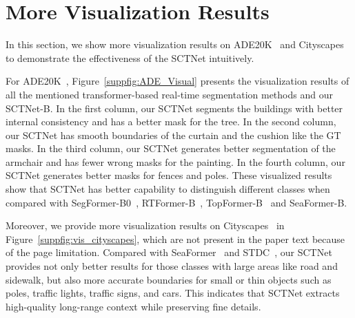 \documentclass[letterpaper]{article} %
\begin{document}
\section{More Visualization Results}\label{section:E}
In this section, we show more visualization results on ADE20K~\cite{zhou2017scene} and Cityscapes~\cite{cordts2016cityscapes} to demonstrate the effectiveness of the SCTNet intuitively.

For ADE20K~\cite{zhou2017scene}, Figure~\ref{suppfig:ADE_Visual} presents the visualization results of all the mentioned transformer-based real-time segmentation methods and our SCTNet-B. In the first column, our SCTNet segments the buildings with better internal consistency and has a better mask for the tree. In the second column, our SCTNet has smooth boundaries of the curtain and the cushion like the GT masks. In the third column, our SCTNet generates better segmentation of the armchair and has fewer wrong masks for the painting. In the fourth column, our SCTNet generates better masks for fences and poles. These visualized results show that SCTNet has better capability to distinguish different classes when compared with SegFormer-B0~\cite{xie2021segformer}, RTFormer-B~\cite{wang2022rtformer}, TopFormer-B~\cite{zhang2022topformer} and SeaFormer-B\cite{wan2023seaformer}.

Moreover, we provide more visualization results on Cityscapes~\cite{cordts2016cityscapes} in Figure~\ref{suppfig:vis_cityscapes}, which are not present in the paper text because of the page limitation. Compared with SeaFormer~\cite{wan2023seaformer} and STDC~\cite{fan2021rethinking}, our SCTNet provides not only better results for those classes with large areas like road and sidewalk, but also more accurate boundaries for small or thin objects such as poles, traffic lights, traffic signs, and cars. This indicates that SCTNet extracts high-quality long-range context while preserving fine details.
\end{document}
